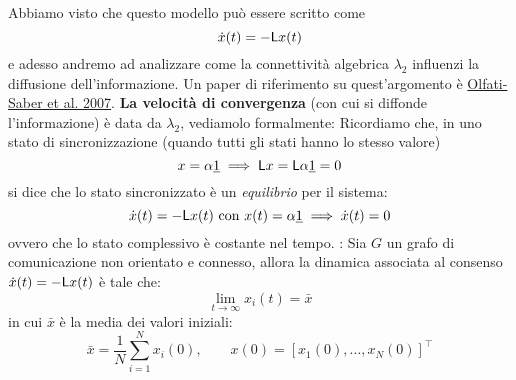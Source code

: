 Abbiamo visto che questo modello pu\`o essere scritto come
\begin{equation}
\dot{x}(t) = -\mathsf{L} x(t)
\end{equation}
e adesso andremo ad analizzare come la connettivit\`a algebrica $\lambda_2$ influenzi la diffusione dell'informazione. Un paper di riferimento su quest'argomento \`e \href{https://ieeexplore.ieee.org/document/4118472}{Olfati-Saber et al. 2007}. 
\textbf{La velocit\`a di convergenza} (con cui si diffonde l'informazione) \`e data da $\lambda_2$, vediamolo formalmente:
Ricordiamo che, in uno stato di sincronizzazione (quando tutti gli stati hanno lo stesso valore)
\begin{equation}
x = \alpha \underline{1} \implies \mathsf{L} x = \mathsf{L} \alpha \underline{1} = 0
\end{equation}
si dice che lo stato sincronizzato \`e un \textit{equilibrio} per il sistema:
\begin{equation}
\dot{x}(t) = - \mathsf{L} x(t) \text{ con } x(t) = \alpha \underline{1} \implies \dot{x}(t) = 0 
\end{equation}
ovvero che lo stato complessivo \`e costante nel tempo.
: 
Sia $G$ un grafo di comunicazione non orientato e connesso, allora la dinamica associata al consenso $\dot{x}(t) = - \mathsf{L} x(t)$ \`e tale che:
\begin{equation}
\lim_{t \to \infty} x_i(t) = \bar{x}
\end{equation}
in cui $\bar{x}$ \`e la media dei valori iniziali:
\begin{equation}
\bar{x} = \frac{1}{N} \sum_{i=1}^N x_i(0), \qquad x(0) = [x_1(0), \dots, x_N(0)]^\intercal
\end{equation}
